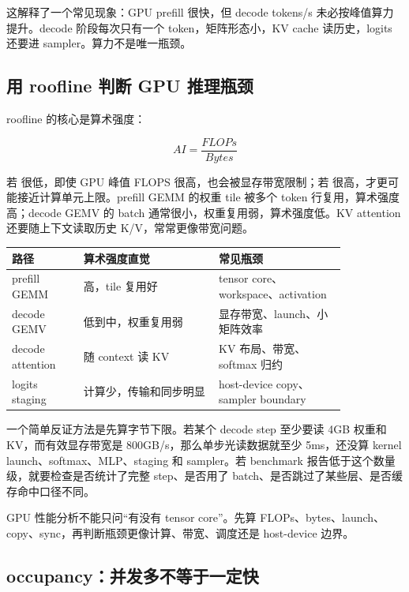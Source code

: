 这解释了一个常见现象：GPU prefill 很快，但 decode tokens/s 未必按峰值算力提升。decode 阶段每次只有一个 token，矩阵形态小，KV cache 读历史，logits 还要进 sampler。算力不是唯一瓶颈。

\subsection{用 roofline 判断 GPU 推理瓶颈}

roofline 的核心是算术强度：

\[
AI=\frac{FLOPs}{Bytes}
\]

若  很低，即使 GPU 峰值 FLOPS 很高，也会被显存带宽限制；若  很高，才更可能接近计算单元上限。prefill GEMM 的权重 tile 被多个 token 行复用，算术强度高；decode GEMV 的 batch 通常很小，权重复用弱，算术强度低。KV attention 还要随上下文读取历史 K/V，常常更像带宽问题。

\begin{center}
\begin{tabular}{p{0.18\linewidth}p{0.34\linewidth}p{0.32\linewidth}}
\toprule
路径 & 算术强度直觉 & 常见瓶颈 \\
\midrule
prefill GEMM & 高，tile 复用好 & tensor core、workspace、activation \\
decode GEMV & 低到中，权重复用弱 & 显存带宽、launch、小矩阵效率 \\
decode attention & 随 context 读 KV & KV 布局、带宽、softmax 归约 \\
logits staging & 计算少，传输和同步明显 & host-device copy、sampler boundary \\
\bottomrule
\end{tabular}
\end{center}

一个简单反证方法是先算字节下限。若某个 decode step 至少要读 4GB 权重和 KV，而有效显存带宽是 800GB/s，那么单步光读数据就至少 5ms，还没算 kernel launch、softmax、MLP、staging 和 sampler。若 benchmark 报告低于这个数量级，就要检查是否统计了完整 step、是否用了 batch、是否跳过了某些层、是否缓存命中口径不同。

\begin{keyidea}
GPU 性能分析不能只问“有没有 tensor core”。先算 FLOPs、bytes、launch、copy、sync，再判断瓶颈更像计算、带宽、调度还是 host-device 边界。
\end{keyidea}

\subsection{occupancy：并发多不等于一定快}

